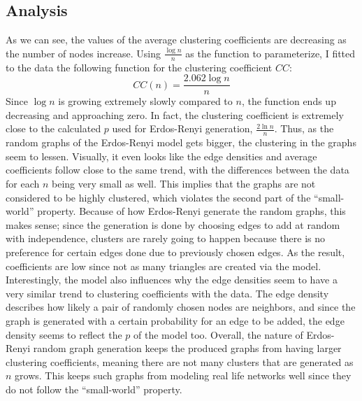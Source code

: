\documentclass{article}
\begin{document}
\subsection{Analysis}
    As we can see, the values of the average clustering coefficients are 
    decreasing as the number of nodes increase. Using $\frac{\log{n}}{n}$ as the
    function to parameterize, I fitted to the data the following function for
    the clustering coefficient $CC$:
    \begin{equation*}
        CC(n) = \frac{2.062\log{n}}{n}
    \end{equation*}
    Since $\log{n}$ is growing extremely slowly compared to $n$, the function 
    ends up decreasing and approaching zero. In fact, the clustering coefficient
    is extremely close to the calculated $p$ used for Erdos-Renyi generation, 
    $\frac{2\ln{n}}{n}$. Thus, as the random graphs of the Erdos-Renyi model 
    gets bigger, the clustering in the graphs seem to lessen. Visually, it even 
    looks like the edge densities and average coefficients follow close to the 
    same trend, with the differences between the data for each $n$ being very 
    small as well. This implies that the graphs are not considered to be highly 
    clustered, which violates the second part of the ``small-world'' property. 
    \nextblurb
    Because of how Erdos-Renyi generate the random graphs, this makes sense; 
    since the generation is done by choosing edges to add at random with 
    independence, clusters are rarely going to happen because there is no
    preference for certain edges done due to previously chosen edges. As the
    result, coefficients are low since not as many triangles are created via the
    model. Interestingly, the model also influences why the edge densities seem 
    to have a very similar trend to clustering coefficients with the data. The 
    edge density describes how likely a pair of randomly chosen nodes are 
    neighbors, and since the graph is generated with a certain probability for
    an edge to be added, the edge density seems to reflect the $p$ of the model
    too. Overall, the nature of Erdos-Renyi random graph generation keeps the
    produced graphs from having larger clustering coefficients, meaning there 
    are not many clusters that are generated as $n$ grows. This keeps such 
    graphs from modeling real life networks well since they do not follow the 
    ``small-world'' property.
\end{document}
